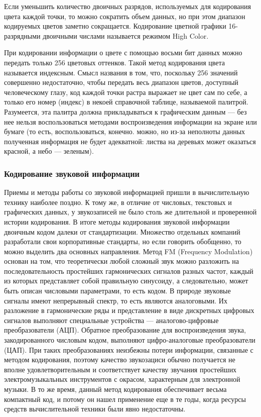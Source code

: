 \documentclass[a4paper]{article}
\begin{document}
Если уменьшить количество двоичных разрядов, используемых для кодирования цвета каждой точки, то можно сократить объем данных, но при этом диапазон кодируемых цветов заметно сокращается. Кодирование цветной графики 16-разрядными двоичными числами называется режимом High Color.

При кодировании информации о цвете с помощью восьми бит данных можно передать только 256 цветовых оттенков. Такой метод кодирования цвета называется индексным. Смысл названия в том, что, поскольку 256 значений совершенно недостаточно, чтобы передать весь диапазон цветов, доступный человеческому глазу, код каждой точки растра выражает не цвет сам по себе, а только его номер (индекс) в некоей справочной таблице, называемой палитрой. Разумеется, эта палитра должна прикладываться к графическим данным — без нее нельзя воспользоваться методами воспроизведения информации на экране или бумаге (то есть, воспользоваться, конечно. можно, но из-за неполноты данных полученная информация не будет адекватной: листва на деревьях может оказаться красной, а небо — зеленым).

\subsubsection{Кодирование звуковой информации}

Приемы и методы работы со звуковой информацией пришли в вычислительную технику наиболее поздно. К тому же, в отличие от числовых, текстовых и графических данных, у звукозаписей не было столь же длительной и проверенной истории кодирования. В итоге методы кодирования звуковой информации двоичным кодом далеки от стандартизации. Множество отдельных компаний разработали свои корпоративные стандарты, но если говорить обобщенно, то можно выделить два основных направления. Метод FM (Frequency Modulation) основан на том, что теоретически любой сложный
звук можно разложить на последовательность простейших гармонических сигналов разных частот, каждый из которых представляет собой правильную синусоиду, а следовательно, может быть описан числовыми параметрами, то есть кодом. В природе звуковые сигналы имеют непрерывный спектр, то есть являются аналоговыми. Их разложение в гармонические ряды и представление в виде дискретных цифровых сигналов выполняют специальные устройства — аналогово-цифровые преобразователи (АЦП). Обратное преобразование для воспроизведения звука, закодированного числовым кодом, выполняют цифро-аналоговые преобразователи (ЦАП). При таких преобразованиях неизбежны потери информации, связанные с методом кодирования, поэтому качество звукозациси обычно получается не вполне удовлетворительным и соответствует качеству звучания простейших электромузыкальных инструментов с окрасом, характерным для электронной музыки. В то же время, данный метод кодирования обеспечивает весьма компактный код, и потому он нашел
применение еще в те годы, когда ресурсы средств вычислительной техники были явно недостаточны.
\end{document}
